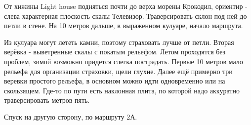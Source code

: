 От хижины Light house подняться почти до верха морены Крокодил,
ориентир - слева характерная плоскость скалы Телевизор. Траверсировать
склон под ней до петли в стене. На 10 метров дальше, в выраженном
кулуаре, начало маршрута.

Из кулуара могут лететь камни, поэтому страховать лучше от петли.
Вторая верёвка - выветренные скалы с покатым рельефом. Летом
проходятся без проблем, зимой возможно придется слегка пострадать.
Первые 10 метров мало рельефа для организации страховки, щели глухие.
Далее ещё примерно три веревки простого рельефа, в основном можно идти
одновременно или на скользящем. Где-то по пути есть наклонная плита,
по которой надо аккуратно траверсировать метров пять.

Спуск на другую сторону, по маршруту 2А.
